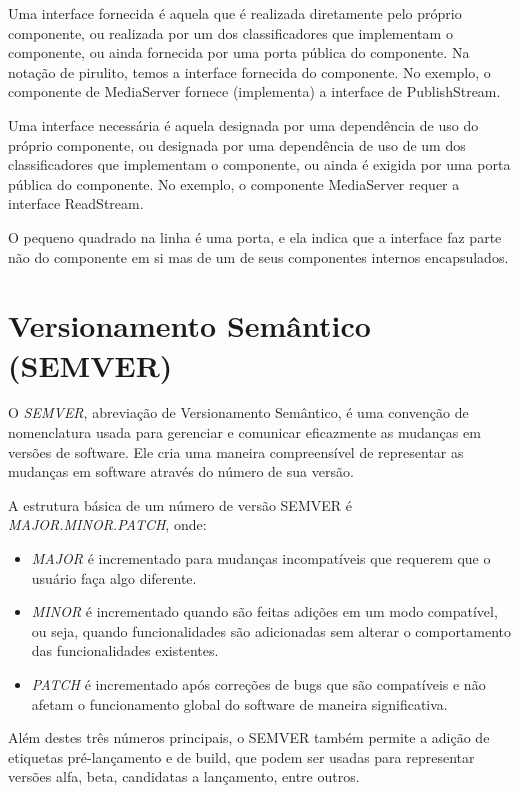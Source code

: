 \documentclass[12pt, %
openright, 
oneside, %
a4paper,    %
brazil]{facom-ufu-abntex2}
\begin{document}
Uma interface fornecida é aquela que é realizada diretamente pelo próprio
componente, ou realizada por um dos classificadores que implementam o
componente, ou ainda fornecida por uma porta pública do componente. Na notação
de pirulito, temos a interface fornecida do componente. No exemplo, o
componente de MediaServer fornece (implementa) a interface de PublishStream.

Uma interface necessária é aquela designada por uma dependência de uso do
próprio componente, ou designada por uma dependência de uso de um dos
classificadores que implementam o componente, ou ainda é exigida por uma porta
pública do componente. No exemplo, o componente MediaServer requer a interface
ReadStream.

O pequeno quadrado na linha é uma porta, e ela indica que a interface faz parte
não do componente em si mas de um de seus componentes internos encapsulados.

\section{Versionamento Semântico (SEMVER)}

O \textit{SEMVER}, abreviação de Versionamento Semântico, é uma convenção de
nomenclatura usada para gerenciar e comunicar eficazmente as mudanças em
versões de software. Ele cria uma maneira compreensível de representar as
mudanças em software através do número de sua versão.

A estrutura básica de um número de versão SEMVER é \textit{MAJOR.MINOR.PATCH},
onde:

\begin{itemize}
	\item \textit{MAJOR} é incrementado para mudanças incompatíveis que requerem que o usuário faça algo diferente.
	\item \textit{MINOR} é incrementado quando são feitas adições em um modo compatível, ou seja, quando funcionalidades são adicionadas sem alterar o comportamento das funcionalidades existentes.
	\item \textit{PATCH} é incrementado após correções de bugs que são compatíveis e não afetam o funcionamento global do software de maneira significativa.
\end{itemize}

Além destes três números principais, o SEMVER também permite a adição de
etiquetas pré-lançamento e de build, que podem ser usadas para representar
versões alfa, beta, candidatas a lançamento, entre outros.
\end{document}
